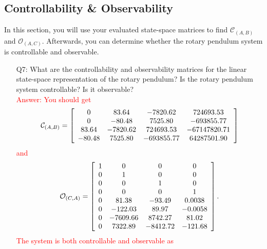 \documentclass[12pt]{report}
\newcommand\drew[1]{\textcolor{red}{#1}}
\begin{document}
\subsection{Controllability \& Observability}\label{subsection:lab2_math_approach}
In this section, you will use your evaluated state-space matrices to find $\mathcal{C}_{(A,B)}$ and $\mathcal{O}_{(A,C)}$. Afterwards, you can determine whether the rotary pendulum system is controllable and observable.
\begin{enumerate}[Question]
    \item[Q7:] What are the controllability and observability matrices for the linear state-space representation of the rotary pendulum? Is the rotary pendulum system controllable? Is it observable?\\
          \drew{Answer: You should get
              \[
                  \mathcal{C}_{(A,B)} =
                  \left[\begin{array}{c c c c}
                          0      & 83.64    & -7820.62   & 724693.53    \\
                          0      & -80.48   & 7525.80    & -693855.77   \\
                          83.64  & -7820.62 & 724693.53  & -67147820.71 \\
                          -80.48 & 7525.80  & -693855.77 & 64287501.90
                      \end{array}\right]
              \]
              and \\
              \[
                  \mathcal{O}_{(C,A)} =
                  \left[\begin{array}{c c c c}
                          1 & 0        & 0        & 0       \\
                          0 & 1        & 0        & 0       \\
                          0 & 0        & 1        & 0       \\
                          0 & 0        & 0        & 1       \\
                          0 & 81.38    & -93.49   & 0.0038  \\
                          0 & -122.03  & 89.97    & -0.0058 \\
                          0 & -7609.66 & 8742.27  & 81.02   \\
                          0 & 7322.89  & -8412.72 & -121.68
                      \end{array}\right].
              \]
              The system is both controllable and observable as
}
\end{enumerate}
\end{document}
